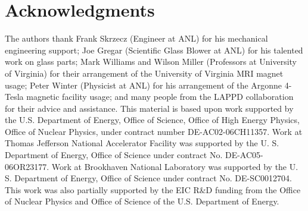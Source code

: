 \section{Acknowledgments}
The authors thank Frank Skrzecz (Engineer at ANL) for his mechanical 
engineering support; Joe Gregar (Scientific Glass Blower at ANL) for his 
talented work on glass parts; Mark Williams and Wilson Miller (Professors at 
University of Virginia) for their arrangement of the University of Virginia MRI 
magnet usage; Peter Winter (Physicist at ANL) for his arrangement of the 
Argonne 4-Tesla magnetic facility usage; and many people from the LAPPD 
collaboration for their advice and assistance. This material is based upon 
work supported by the U.S. Department of Energy, Office of Science, Office of 
High Energy Physics, Office of Nuclear Physics, under contract number 
DE-AC02-06CH11357. Work at Thomas Jefferson National Accelerator Facility was 
supported by the U. S. Department of Energy, Office of Science under contract 
No. DE-AC05-06OR23177. Work at Brookhaven National Laboratory was supported by 
the U. S. Department of Energy, Office of Science under contract No.  
DE-SC0012704. This work was also partially supported by the EIC R\&D funding 
from the Office of Nuclear Physics and Office of Science of the U.S.  
Department of Energy.
